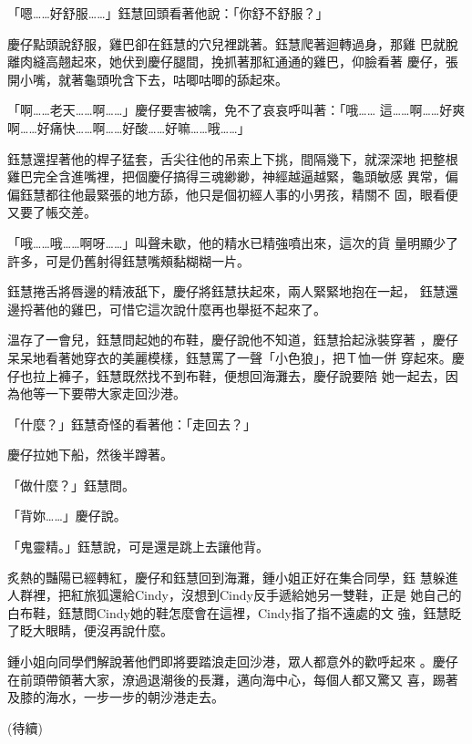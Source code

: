 「嗯……好舒服……」鈺慧回頭看著他說：「你舒不舒服？」

慶仔點頭說舒服，雞巴卻在鈺慧的穴兒裡跳著。鈺慧爬著迴轉過身，那雞
巴就脫離肉縫高翹起來，她伏到慶仔腿間，挽抓著那紅通通的雞巴，仰臉看著
慶仔，張開小嘴，就著龜頭吮含下去，咕唧咕唧的舔起來。

「啊……老天……啊……」慶仔要害被噙，免不了哀哀呼叫著：「哦……
這……啊……好爽啊……好痛快……啊……好酸……好嘛……哦……」

鈺慧還捏著他的桿子猛套，舌尖往他的吊索上下挑，間隔幾下，就深深地
把整根雞巴完全含進嘴裡，把個慶仔搞得三魂緲緲，神經越逼越緊，龜頭敏感
異常，偏偏鈺慧都往他最緊張的地方舔，他只是個初經人事的小男孩，精關不
固，眼看便又要了帳交差。

「哦……哦……啊呀……」叫聲未歇，他的精水已精強噴出來，這次的貨
量明顯少了許多，可是仍舊射得鈺慧嘴頰黏糊糊一片。

鈺慧捲舌將唇邊的精液舐下，慶仔將鈺慧扶起來，兩人緊緊地抱在一起，
鈺慧還邊捋著他的雞巴，可惜它這次說什麼再也舉挺不起來了。

溫存了一會兒，鈺慧問起她的布鞋，慶仔說他不知道，鈺慧拾起泳裝穿著
，慶仔呆呆地看著她穿衣的美麗模樣，鈺慧罵了一聲「小色狼」，把Ｔ恤一併
穿起來。慶仔也拉上褲子，鈺慧既然找不到布鞋，便想回海灘去，慶仔說要陪
她一起去，因為他等一下要帶大家走回沙港。

「什麼？」鈺慧奇怪的看著他：「走回去？」

慶仔拉她下船，然後半蹲著。

「做什麼？」鈺慧問。

「背妳……」慶仔說。

「鬼靈精。」鈺慧說，可是還是跳上去讓他背。

炙熱的豔陽已經轉紅，慶仔和鈺慧回到海灘，鍾小姐正好在集合同學，鈺
慧躲進人群裡，把紅旅狐還給Cindy，沒想到Cindy反手遞給她另一雙鞋，正是
她自己的白布鞋，鈺慧問Cindy她的鞋怎麼會在這裡，Cindy指了指不遠處的文
強，鈺慧眨了眨大眼睛，便沒再說什麼。

鍾小姐向同學們解說著他們即將要踏浪走回沙港，眾人都意外的歡呼起來
。慶仔在前頭帶領著大家，潦過退潮後的長灘，邁向海中心，每個人都又驚又
喜，踢著及膝的海水，一步一步的朝沙港走去。

(待續)










